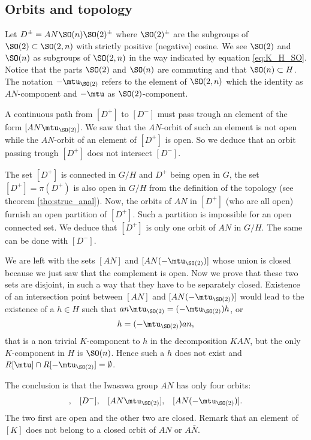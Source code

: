 \subsection{Orbits  and topology}
\label{PgTopoOrb}

Let  $D^{\pm}=AN\SO(n)\SO(2)^{\pm}$ where $\SO(2)^{\pm}$ are the subgroups of $\SO(2)\subset \SO(2,n)$ with strictly positive (negative) cosine. We see $\SO(2)$ and $\SO(n)$ as subgroups of $\SO(2,n)$ in the way indicated by equation \eqref{eq:K_H_SO}. Notice that the parts $\SO(2)$ and $\SO(n)$ are commuting and that $\SO(n)\subset H$. The notation $-\mtu_{\SO(2)}$ refers to the element of $\SO(2,n)$ which the identity as $AN$-component and $-\mtu$ as $\SO(2)$-component.

A continuous path from $[D^+]$ to $[D^-]$ must pass trough an element of the form $[AN\mtu_{\SO(2)}]$. We saw that the $AN$-orbit of such an element is not open while the $AN$-orbit of an element of $[D^+]$ is open. So we deduce that an orbit passing trough $[D^+]$ does not intersect $[D^-]$.

The set $[D^+]$ is connected in $G/H$ and $D^+$  being open in $G$, the set $[D^+]=\pi(D^+)$ is also open in $G/H$ from the definition of the topology (see theorem \ref{tho:struc_anal}). Now, the orbits of $AN$ in $[D^+]$ (who are all open) furnish an open partition of $[D^+]$. Such a partition is impossible for an open connected set. We deduce that $[D^+]$ is only one orbit of $AN$ in $G/H$. The same can be done with $[D^-]$.

We are left with the sets $[AN]$ and $[AN(-\mtu_{\SO(2)})]$ whose union is closed because we just saw that the complement is open. Now we prove that these two sets are disjoint, in such a way that they have to be separately closed. Existence of an intersection point between $[AN]$ and $[AN(-\mtu_{\SO(2)})]$ would lead to the existence of a $h\in H$ such that $an\mtu_{\SO(2)}=(-\mtu_{\SO(2)})h$, or
\[ 
  h=(-\mtu_{\SO(2)})an,
\]
that is a non trivial $K$-component to $h$ in the decomposition $KAN$, but the only $K$-component in $H$ is $\SO(n)$. Hence such a $h$ does not exist and $R[\mtu]\cap R[-\mtu_{\SO(2)}]=\emptyset$.

The conclusion is that the Iwasawa group $AN$ has only four orbits:
\begin{align}
[D^+],&&[D^-],&&[AN\mtu_{\SO(2)}],&&[AN(-\mtu_{\SO(2)})].
\end{align}
The two first are open and the other two are closed. Remark\label{PgNoticeKpassung} that an element of $[K]$ does not belong to a closed orbit of $AN$ or $A\bar N$.


